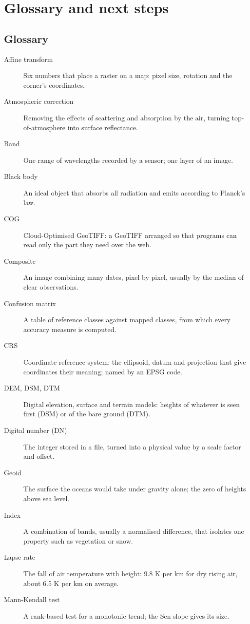 \chapter{Glossary and next steps}\label{ch:next}

\section{Glossary}
\begin{description}
\item[Affine transform] Six numbers that place a raster on a map: pixel size, rotation and the corner's coordinates.
\item[Atmospheric correction] Removing the effects of scattering and absorption by the air, turning top-of-atmosphere into surface reflectance.
\item[Band] One range of wavelengths recorded by a sensor; one layer of an image.
\item[Black body] An ideal object that absorbs all radiation and emits according to Planck's law.
\item[COG] Cloud-Optimised GeoTIFF: a GeoTIFF arranged so that programs can read only the part they need over the web.
\item[Composite] An image combining many dates, pixel by pixel, usually by the median of clear observations.
\item[Confusion matrix] A table of reference classes against mapped classes, from which every accuracy measure is computed.
\item[CRS] Coordinate reference system: the ellipsoid, datum and projection that give coordinates their meaning; named by an EPSG code.
\item[DEM, DSM, DTM] Digital elevation, surface and terrain models: heights of whatever is seen first (DSM) or of the bare ground (DTM).
\item[Digital number (DN)] The integer stored in a file, turned into a physical value by a scale factor and offset.
\item[Geoid] The surface the oceans would take under gravity alone; the zero of heights above sea level.
\item[Index] A combination of bands, usually a normalised difference, that isolates one property such as vegetation or snow.
\item[Lapse rate] The fall of air temperature with height: 9.8 K per km for dry rising air, about 6.5 K per km on average.
\item[Mann-Kendall test] A rank-based test for a monotonic trend; the Sen slope gives its size.

\end{description}
